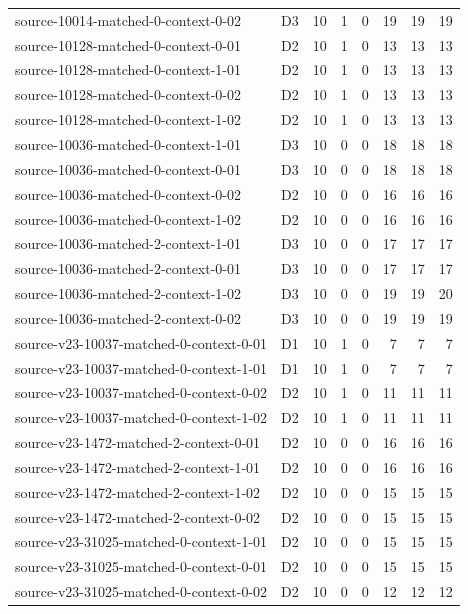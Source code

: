\begin{longtable}{p{}lrrrrrr}
source-10014-matched-0-context-0-02 & D3 & 10 & 1 & 0 & 19 & 19 & 19\\
source-10128-matched-0-context-0-01 & D2 & 10 & 1 & 0 & 13 & 13 & 13\\
source-10128-matched-0-context-1-01 & D2 & 10 & 1 & 0 & 13 & 13 & 13\\
source-10128-matched-0-context-0-02 & D2 & 10 & 1 & 0 & 13 & 13 & 13\\
source-10128-matched-0-context-1-02 & D2 & 10 & 1 & 0 & 13 & 13 & 13\\
source-10036-matched-0-context-1-01 & D3 & 10 & 0 & 0 & 18 & 18 & 18\\
source-10036-matched-0-context-0-01 & D3 & 10 & 0 & 0 & 18 & 18 & 18\\
source-10036-matched-0-context-0-02 & D2 & 10 & 0 & 0 & 16 & 16 & 16\\
source-10036-matched-0-context-1-02 & D2 & 10 & 0 & 0 & 16 & 16 & 16\\
source-10036-matched-2-context-1-01 & D3 & 10 & 0 & 0 & 17 & 17 & 17\\
source-10036-matched-2-context-0-01 & D3 & 10 & 0 & 0 & 17 & 17 & 17\\
source-10036-matched-2-context-1-02 & D3 & 10 & 0 & 0 & 19 & 19 & 20\\
source-10036-matched-2-context-0-02 & D3 & 10 & 0 & 0 & 19 & 19 & 19\\
source-v23-10037-matched-0-context-0-01 & D1 & 10 & 1 & 0 & 7 & 7 & 7\\
source-v23-10037-matched-0-context-1-01 & D1 & 10 & 1 & 0 & 7 & 7 & 7\\
source-v23-10037-matched-0-context-0-02 & D2 & 10 & 1 & 0 & 11 & 11 & 11\\
source-v23-10037-matched-0-context-1-02 & D2 & 10 & 1 & 0 & 11 & 11 & 11\\
source-v23-1472-matched-2-context-0-01 & D2 & 10 & 0 & 0 & 16 & 16 & 16\\
source-v23-1472-matched-2-context-1-01 & D2 & 10 & 0 & 0 & 16 & 16 & 16\\
source-v23-1472-matched-2-context-1-02 & D2 & 10 & 0 & 0 & 15 & 15 & 15\\
source-v23-1472-matched-2-context-0-02 & D2 & 10 & 0 & 0 & 15 & 15 & 15\\
source-v23-31025-matched-0-context-1-01 & D2 & 10 & 0 & 0 & 15 & 15 & 15\\
source-v23-31025-matched-0-context-0-01 & D2 & 10 & 0 & 0 & 15 & 15 & 15\\
source-v23-31025-matched-0-context-0-02 & D2 & 10 & 0 & 0 & 12 & 12 & 12\\

\end{longtable}
